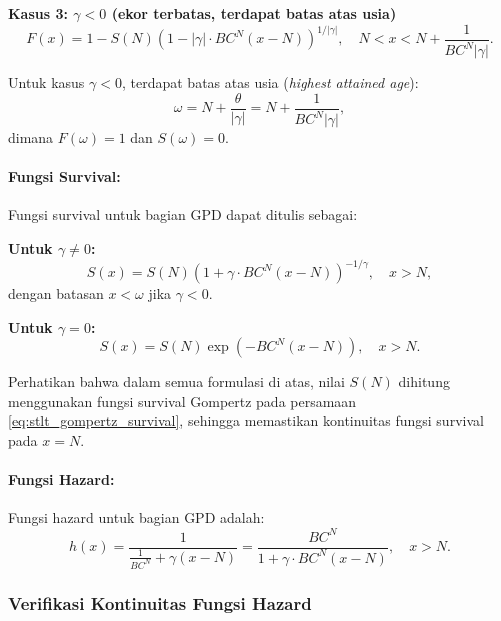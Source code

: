 \textbf{Kasus 3: $\gamma < 0$ (ekor terbatas, terdapat batas atas usia)}
\begin{equation}
F(x) = 1 - S(N) \left(1 - |\gamma| \cdot BC^N(x-N)\right)^{1/|\gamma|}, \quad N < x < N + \frac{1}{BC^N|\gamma|}.
\label{eq:stlt_gpd_cdf_negative}
\end{equation}

Untuk kasus $\gamma < 0$, terdapat batas atas usia (\textit{highest attained age}):
\begin{equation}
\omega = N + \frac{\theta}{|\gamma|} = N + \frac{1}{BC^N|\gamma|},
\label{eq:stlt_omega}
\end{equation}
dimana $F(\omega) = 1$ dan $S(\omega) = 0$.

\paragraph{Fungsi Survival:}

Fungsi survival untuk bagian GPD dapat ditulis sebagai:

\textbf{Untuk $\gamma \neq 0$:}
\begin{equation}
S(x) = S(N) \left(1 + \gamma \cdot BC^N(x-N)\right)^{-1/\gamma}, \quad x > N,
\label{eq:stlt_gpd_survival_general}
\end{equation}
dengan batasan $x < \omega$ jika $\gamma < 0$.

\textbf{Untuk $\gamma = 0$:}
\begin{equation}
S(x) = S(N) \exp\left(-BC^N(x-N)\right), \quad x > N.
\label{eq:stlt_gpd_survival_zero}
\end{equation}

Perhatikan bahwa dalam semua formulasi di atas, nilai $S(N)$ dihitung menggunakan fungsi survival Gompertz pada persamaan \eqref{eq:stlt_gompertz_survival}, sehingga memastikan kontinuitas fungsi survival pada $x = N$.

\paragraph{Fungsi Hazard:}

Fungsi hazard untuk bagian GPD adalah:
\begin{equation}
h(x) = \frac{1}{\frac{1}{BC^N} + \gamma(x-N)} = \frac{BC^N}{1 + \gamma \cdot BC^N(x-N)}, \quad x > N.
\label{eq:stlt_gpd_hazard}
\end{equation}

\subsubsection{Verifikasi Kontinuitas Fungsi Hazard}

